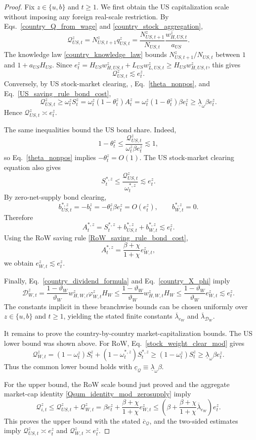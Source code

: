 \documentclass{article}
\begin{document}
\begin{proof}
Fix $z\in\{u,b\}$ and $t\ge1$. We first obtain the US capitalization scale without imposing any foreign real-scale restriction. By Eqs.~\eqref{country_Q_from_wage} and \eqref{country_stock_aggregation},
\[
\mathcal Q_{US,t}^z
=
N_{US,t+1}^zq_{US,t}^z
=
\frac{N_{US,t+1}^z}{N_{US,t}}
\frac{w_{H,US,t}^z}{a_{US}}.
\]
The knowledge law \eqref{country_knowledge_law} bounds $N_{US,t+1}^z/N_{US,t}$ between $1$ and $1+a_{US}H_{US}$. Since
$e_t^z=H_{US}w_{H,US,t}^z+L_{US}w_{L,US,t}^z\ge H_{US}w_{H,US,t}^z$, this gives
\[
\mathcal Q_{US,t}^z\lesssim e_t^z.
\]
Conversely, by US stock-market clearing, , Eq.~\eqref{theta_nonpos}, and Eq.~\eqref{US_saving_rule_bond_cost},
\[
\mathcal Q_{US,t}^z
\ge
\omega_t^zS_t^z
=
\omega_t^z(1-\theta_t^z)A_t^z
=
\omega_t^z(1-\theta_t^z)\beta e_t^z
\ge
\underline\lambda_\omega\beta e_t^z.
\]
Hence $\mathcal Q_{US,t}^z\asymp e_t^z$.

The same inequalities bound the US bond share. Indeed,
\[
1-\theta_t^z
\le
\frac{\mathcal Q_{US,t}^z}{\omega_t^z\beta e_t^z}
\lesssim 1,
\]
so Eq.~\eqref{theta_nonpos} implies $-\theta_t^z=O(1)$. The US stock-market clearing equation also gives
\[
S_t^{*,z}
\le
\frac{\mathcal Q_{US,t}^z}{\omega_t^{*,z}}
\lesssim e_t^z.
\]
By zero-net-supply bond clearing,
\[
b_{US,t}^{*,z}=-b_t^z=-\theta_t^z\beta e_t^z=O(e_t^z),
\qquad
b_{W,t}^{*,z}=0.
\]
Therefore
\[
A_t^{*,z}
=S_t^{*,z}+b_{US,t}^{*,z}+b_{W,t}^{*,z}
\lesssim e_t^z.
\]
Using the RoW saving rule \eqref{RoW_saving_rule_bond_cost},
\[
A_t^{*,z}=\frac{\beta+\chi}{1+\chi}e_{W,t}^z,
\]
we obtain $e_{W,t}^z\lesssim e_t^z$.

Finally, Eq.~\eqref{country_dividend_formula} and Eq.~\eqref{country_X_phi} imply
\[
\mathcal D_{W,t}^z
=
\frac{1-\vartheta_W}{\vartheta_W}
w_{H,W,t}^z\varphi_{W,t}^zH_W
\le
\frac{1-\vartheta_W}{\vartheta_W}
w_{H,W,t}^zH_W
\le
\frac{1-\vartheta_W}{\vartheta_W}e_{W,t}^z
\lesssim e_t^z.
\]
The constants implicit in these branchwise bounds can be chosen uniformly over $z\in\{u,b\}$ and $t\ge1$, yielding the stated finite constants
$\overline\lambda_{e_W}$ and $\overline\lambda_{\mathcal D_W}$.

It remains to prove the country-by-country market-capitalization bounds. The US lower bound was shown above. For RoW, Eq.~\eqref{stock_weight_clear_mod} gives
\[
\mathcal Q_{W,t}^z
=
(1-\omega_t^z)S_t^z+(1-\omega_t^{*,z})S_t^{*,z}
\ge
(1-\omega_t^z)S_t^z
\ge
\underline\lambda_\omega\beta e_t^z.
\]
Thus the common lower bound holds with
$\underline c_{\mathcal Q}\equiv\underline\lambda_\omega\beta$.

For the upper bound, the RoW scale bound just proved and the aggregate market-cap identity \eqref{Qsum_identity_mod_zerosupply} imply
\[
\mathcal Q_{i,t}^z
\le
\mathcal Q_{US,t}^z+\mathcal Q_{W,t}^z
=
\beta e_t^z+\frac{\beta+\chi}{1+\chi}e_{W,t}^z
\le
\left(\beta+\frac{\beta+\chi}{1+\chi}\overline\lambda_{e_W}\right)e_t^z.
\]
This proves the upper bound with the stated $\overline c_{\mathcal Q}$, and the two-sided estimates imply
$\mathcal Q_{US,t}^z\asymp e_t^z$ and $\mathcal Q_{W,t}^z\asymp e_t^z$.
\end{proof}
\end{document}
